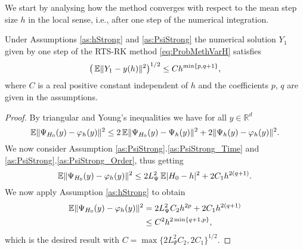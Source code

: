 \documentclass{siamart1116}
\numberwithin{theorem}{section}
\DeclarePairedDelimiter{\abs}{\lvert}{\rvert}
\DeclarePairedDelimiter{\norm}{\|}{\|}
\renewcommand{\phi}{\varphi}
\newcommand{\R}{\mathbb{R}}
\newcommand{\E}{\operatorname{\mathbb{E}}}
\newcommand{\corr}[1]{{\color{bordeaux}#1}}
\begin{document}
We start by analysing how the method converges with respect to the mean step size $h$ in the local sense, i.e., after one step of the numerical integration.
\begin{lemma}\label{thm:StrongOrderLocal} Under Assumptions \ref{as:hStrong} and \ref{as:PsiStrong} the numerical solution $Y_1$ given by one step of the RTS-RK method \eqref{eq:ProbMethVarH} satisfies 
	\corr{\begin{equation}
		\big(\E\norm{Y_1 - y(h)}^2\big)^{1/2} \leq C h^{\min\{p, q + 1\}},
	\end{equation}}
	where $C$ is a real positive constant independent of $h$ and the coefficients $p$, $q$ are given in the assumptions.
\end{lemma}
\begin{proof} By triangular and Young's inequalities we have for all $y \in \R^d$ 
	\begin{equation}
		\E\norm{\Psi_{H_0}(y) - \phi_h(y)}^2 \leq 2\E\norm{\Psi_{H_0}(y) - \Psi_h(y)}^2 + 2\norm{\Psi_h(y) - \phi_h(y)}^2.
	\end{equation}		
	We now consider Assumption \ref{as:PsiStrong}.\ref{as:PsiStrong_Time} and \ref{as:PsiStrong}.\ref{as:PsiStrong_Order}, thus getting
	\begin{equation}\label{eq:LocalErrorDecomposition}
		\E\norm{\Psi_{H_0}(y) - \phi_h(y)}^2 \leq 2L_{\Psi}^2 \E\abs{H_0 - h}^2 + 2C_1 h^{2(q+1)}.
	\end{equation}
	We now apply Assumption \ref{as:hStrong} to obtain
	\begin{equation}
	\begin{aligned}
		\E\norm{\Psi_{H_0}(y) - \phi_h(y)}^2 &= 2L_{\Psi}^2 C_2 h^{2p} + 2 C_1 h^{2(q+1)} \\
		&\leq C^2 h^{2\min\{q+1, p\}},
	\end{aligned}
	\end{equation}
	which is the desired result with $C = \max\{2L_{\Psi}^2 C_2, 2 C_1\}^{1/2}$.
\end{proof}
\end{document}
